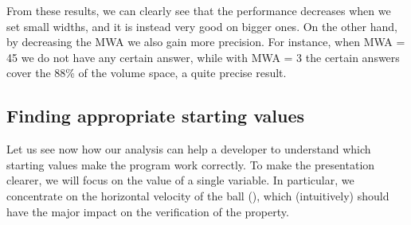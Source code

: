 
From these results, we can clearly see that the performance decreases when we set small widths, and it is instead very good on bigger ones. On the other hand, by decreasing the MWA we also gain more precision. For instance, when MWA = 45 we do not have any certain answer, while with MWA = 3 the certain answers cover the 88\% of the volume space, a quite precise result. 

\subsection{Finding appropriate starting values}
Let us see now how our analysis can help a developer to understand which starting values make the program work correctly. To make the presentation clearer, we will focus on the value of a single variable. In particular, we concentrate on the horizontal velocity of the ball (), which (intuitively) should have the major impact on the verification of the property. 


